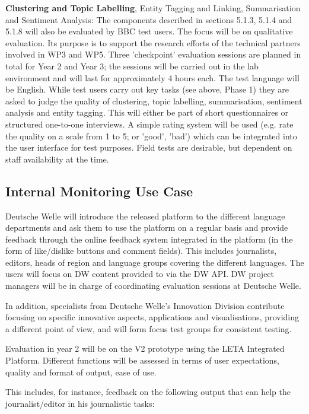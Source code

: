\textbf{Clustering and Topic Labelling}, Entity Tagging and Linking, Summarisation and Sentiment Analysis:
The components described in sections 5.1.3, 5.1.4 and 5.1.8 will also be evaluated by BBC test users. The focus will be on qualitative evaluation. Its purpose is to support the research efforts of the technical partners involved in WP3 and WP5. Three 'checkpoint' evaluation sessions are planned in total for Year 2 and Year 3; the sessions will be carried out in the lab environment and will last for approximately 4 hours each. The test language will be English. While test users carry out key tasks (see above, Phase 1) they are asked to judge the quality of clustering, topic labelling, summarisation, sentiment analysis and entity tagging. This will either be part of short questionnaires or structured one-to-one interviews. A simple rating system will be used (e.g. rate the quality on a scale from 1 to 5; or 'good', 'bad') which can be integrated into the user interface for test purposes. Field tests are desirable, but dependent on staff availability at the time.


\subsection{Internal Monitoring Use Case}

Deutsche Welle will introduce the released  platform to the different language departments and ask them to use the \SUMMA platform on a regular basis and provide feedback through the online feedback system integrated in the platform (in the form of like/dislike buttons and comment fields). This includes journalists, editors, heads of region and language groups covering the different \SUMMA languages. The users will focus on DW content provided to \SUMMA via the DW API. DW \SUMMA project managers will be in charge of coordinating evaluation sessions at Deutsche Welle. 

In addition, specialists from Deutsche Welle’s Innovation Division contribute focusing on specific innovative aspects, applications and visualisations, providing a different point of view, and will form focus test groups for consistent testing.

Evaluation in year 2 will be on the V2 prototype using the LETA Integrated Platform. Different functions will be assessed in terms of user expectations, quality and format of output, ease of use.  

This includes, for instance, feedback on the following \SUMMA output that can help the journalist/editor in his journalistic tasks:

